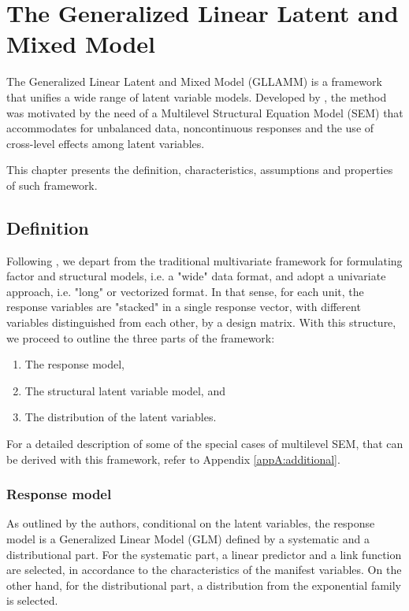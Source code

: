 \chapter{The Generalized Linear Latent and Mixed Model} \label{chap:framework}

The Generalized Linear Latent and Mixed Model (GLLAMM) is a framework that unifies a wide range of latent variable models. Developed by \citet{Rabe_et_al_2004a, Rabe_et_al_2004b, Rabe_et_al_2004c, Skrondal_et_al_2004a, Rabe_et_al_2012}, the method was motivated by the need of a Multilevel Structural Equation Model (SEM) that accommodates for unbalanced data, noncontinuous responses and the use of cross-level effects among latent variables. 

This chapter presents the definition, characteristics, assumptions and properties of such framework.


\section{Definition} \label{sect:definition}
Following \citet{Rabe_et_al_2004a, Rabe_et_al_2012}, we depart from the traditional multivariate framework for formulating factor and structural models, i.e. a "wide" data format, and adopt a univariate approach, i.e. "long" or vectorized format. In that sense, for each unit, the response variables are "stacked" in a single response vector, with different variables distinguished from each other, by a design matrix. With this structure, we proceed to outline the three parts of the framework: 
\begin{enumerate}
	\item The response model, 
	\item The structural latent variable model, and 
	\item The distribution of the latent variables. 
\end{enumerate}
For a detailed description of some of the special cases of multilevel SEM, that can be derived with this framework, refer to Appendix \ref{appA:additional}.


\subsection{Response model} \label{s_sect:response}
As outlined by the authors, conditional on the latent variables, the response model is a Generalized Linear Model (GLM) defined by a systematic and a distributional part. For the systematic part, a linear predictor and a link function are selected, in accordance to the characteristics of the manifest variables. On the other hand, for the distributional part, a distribution from the exponential family is selected.

